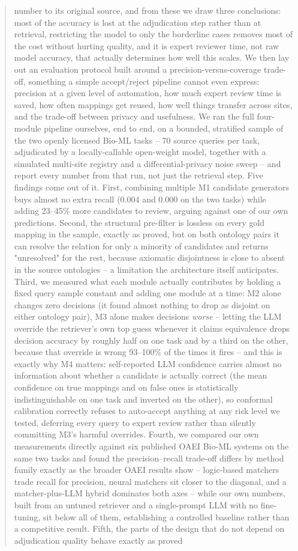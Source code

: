 \documentclass[conference]{IEEEtran}
\begin{document}
\begin{abstract}
number to its original source, and from these we draw three conclusions: most of the accuracy is lost at the adjudication step rather than at retrieval, restricting the model to only the borderline cases removes most of the cost without hurting quality, and it is expert reviewer time, not raw model accuracy, that actually determines how well this scales. We then lay out an evaluation protocol built around a precision-versus-coverage trade-off, something a simple accept/reject pipeline cannot even express: precision at a given level of automation, how much expert review time is saved, how often mappings get reused, how well things transfer across sites, and the trade-off between privacy and usefulness. We ran the full four-module pipeline ourselves, end to end, on a bounded, stratified sample of the two openly licensed Bio-ML tasks -- 70 source queries per task, adjudicated by a locally-callable open-weight model, together with a simulated multi-site registry and a differential-privacy noise sweep -- and report every number from that run, not just the retrieval step. Five findings come out of it. First, combining multiple M1 candidate generators buys almost no extra recall (0.004 and 0.000 on the two tasks) while adding 23--45\% more candidates to review, arguing against one of our own predictions. Second, the structural pre-filter is lossless on every gold mapping in the sample, exactly as proved, but on both ontology pairs it can resolve the relation for only a minority of candidates and returns "unresolved" for the rest, because axiomatic disjointness is close to absent in the source ontologies -- a limitation the architecture itself anticipates. Third, we measured what each module actually contributes by holding a fixed query sample constant and adding one module at a time: M2 alone changes zero decisions (it found almost nothing to drop as disjoint on either ontology pair), M3 alone makes decisions \emph{worse} -- letting the LLM override the retriever's own top guess whenever it claims equivalence drops decision accuracy by roughly half on one task and by a third on the other, because that override is wrong 93--100\% of the times it fires -- and this is exactly why M4 matters: self-reported LLM confidence carries almost no information about whether a candidate is actually correct (the mean confidence on true mappings and on false ones is statistically indistinguishable on one task and inverted on the other), so conformal calibration correctly refuses to auto-accept anything at any risk level we tested, deferring every query to expert review rather than silently committing M3's harmful overrides. Fourth, we compared our own measurements directly against six published OAEI Bio-ML systems on the same two tasks and found the precision--recall trade-off differs by method family exactly as the broader OAEI results show -- logic-based matchers trade recall for precision, neural matchers sit closer to the diagonal, and a matcher-plus-LLM hybrid dominates both axes -- while our own numbers, built from an untuned retriever and a single-prompt LLM with no fine-tuning, sit below all of them, establishing a controlled baseline rather than a competitive result. Fifth, the parts of the design that do not depend on adjudication quality behave exactly as proved 
\end{abstract}
\end{document}
